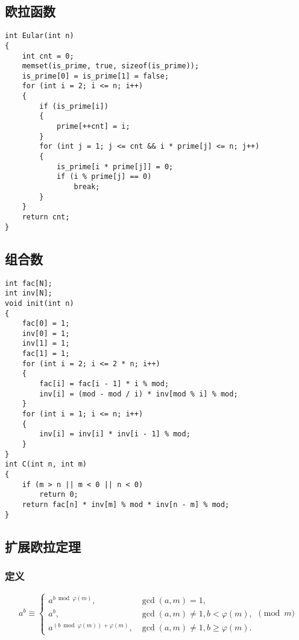 \documentclass[]{article}
\begin{document}
\hypertarget{ux6b27ux62c9ux51fdux6570}{%
\subsection{欧拉函数}\label{ux6b27ux62c9ux51fdux6570}}

\begin{verbatim}
int Eular(int n)
{
    int cnt = 0;
    memset(is_prime, true, sizeof(is_prime));
    is_prime[0] = is_prime[1] = false;
    for (int i = 2; i <= n; i++)
    {
        if (is_prime[i])
        {
            prime[++cnt] = i;
        }
        for (int j = 1; j <= cnt && i * prime[j] <= n; j++)
        {
            is_prime[i * prime[j]] = 0;
            if (i % prime[j] == 0)
                break;
        }
    }
    return cnt;
}
\end{verbatim}

\hypertarget{ux7ec4ux5408ux6570}{%
\subsection{组合数}\label{ux7ec4ux5408ux6570}}

\begin{verbatim}
int fac[N];
int inv[N];
void init(int n)
{
    fac[0] = 1;
    inv[0] = 1;
    inv[1] = 1;
    fac[1] = 1;
    for (int i = 2; i <= 2 * n; i++)
    {
        fac[i] = fac[i - 1] * i % mod;
        inv[i] = (mod - mod / i) * inv[mod % i] % mod;
    }
    for (int i = 1; i <= n; i++)
    {
        inv[i] = inv[i] * inv[i - 1] % mod;
    }
}
int C(int n, int m)
{
    if (m > n || m < 0 || n < 0)
        return 0;
    return fac[n] * inv[m] % mod * inv[n - m] % mod;
}
\end{verbatim}

\hypertarget{ux6269ux5c55ux6b27ux62c9ux5b9aux7406}{%
\subsection{扩展欧拉定理}\label{ux6269ux5c55ux6b27ux62c9ux5b9aux7406}}

\hypertarget{ux5b9aux4e49}{%
\subsubsection{定义}\label{ux5b9aux4e49}}

\[
a^b \equiv \begin{cases}
  a^{b \bmod \varphi(m)},                &\gcd(a,m) =  1,                   \\
  a^b,                                   &\gcd(a,m)\ne 1, b <   \varphi(m), \\
  a^{(b \bmod \varphi(m)) + \varphi(m)}, &\gcd(a,m)\ne 1, b \ge \varphi(m).
\end{cases} \pmod m
\]
\end{document}
